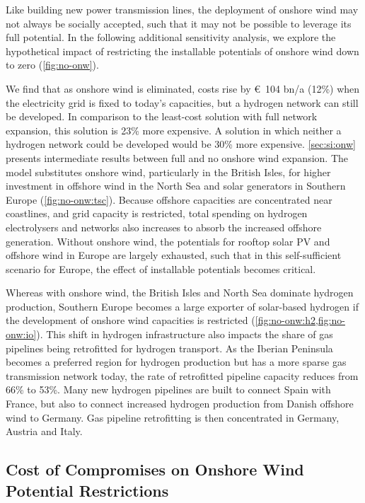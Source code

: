 Like building new power transmission lines, the deployment of onshore wind may
not always be socially accepted, such that it may not be possible to leverage
its full potential. In the following additional sensitivity analysis, we explore
the hypothetical impact of restricting the installable potentials of onshore
wind down to zero (\cref{fig:no-onw}).

We find that as onshore wind is eliminated, costs rise by \euro~104 bn/a (12\%)
when the electricity grid is fixed to today's capacities, but a hydrogen network
can still be developed. In comparison to the least-cost solution with full
network expansion, this solution is 23\% more expensive. A solution in which
neither a hydrogen network could be developed would be 30\% more expensive.
\cref{sec:si:onw} presents intermediate results between full and no onshore wind
expansion. The model substitutes onshore wind, particularly in the British
Isles, for higher investment in offshore wind in the North Sea and solar
generators in Southern Europe (\cref{fig:no-onw:tsc}). Because offshore
capacities are concentrated near coastlines, and grid capacity is restricted,
total spending on hydrogen electrolysers and networks also increases to absorb
the increased offshore generation. Without onshore wind, the potentials for
rooftop solar PV and offshore wind in Europe are largely exhausted, such that in
this self-sufficient scenario for Europe, the effect of installable potentials
becomes critical.

Whereas with onshore wind, the British Isles and North Sea dominate hydrogen
production, Southern Europe becomes a large exporter of solar-based hydrogen if
the development of onshore wind capacities is restricted
(\cref{fig:no-onw:h2,fig:no-onw:io}). This shift in hydrogen infrastructure also
impacts the share of gas pipelines being retrofitted for hydrogen transport. As
the Iberian Peninsula becomes a preferred region for hydrogen production but has
a more sparse gas transmission network today, the rate of retrofitted pipeline
capacity reduces from 66\% to 53\%. Many new hydrogen pipelines are built to
connect Spain with France, but also to connect increased hydrogen production
from Danish offshore wind to Germany. Gas pipeline retrofitting is then
concentrated in Germany, Austria and Italy.

\subsection{Cost of Compromises on Onshore Wind Potential Restrictions}
\label{sec:si:onw-compromise}

